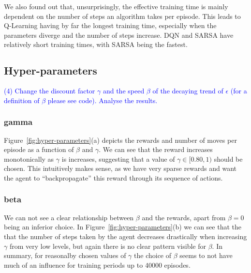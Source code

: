 \documentclass[conference]{IEEEtran}
\begin{document}
We also found out that, unsurprisingly, the effective training time is mainly dependent on the number of steps an algorithm takes per episode. This leads to Q-Learning having by far the longest training time, especially when the parameters diverge and the number of steps increase. DQN and SARSA have relatively short training times, with SARSA being the fastest.


\subsection{Hyper-parameters}\label{sec:hyper-parameters}



\textcolor{blue}{(4) Change the discount factor $\gamma$ and the speed $\beta$ of the decaying trend of $\epsilon$ (for a definition of $\beta$ please see code). Analyse the results.}


\subsubsection{gamma}
Figure~\ref{fig:hyper-parameters}(a) depicts the rewards and number of moves per episode as a function of $\beta$ and $\gamma$. We can see that the reward increases monotonically as $\gamma$ is increases, suggesting that a value of $\gamma\in[0.80, 1)$ should be chosen. This intuitively makes sense, as we have very sparse rewards and want the agent to ``backpropagate'' this reward through its sequence of actions. 

\subsubsection{beta}
We can not see a clear relationship between $\beta$ and the rewards, apart from $\beta=0$ being an inferior choice. In Figure~\ref{fig:hyper-parameters}(b) we can see that the that the number of steps taken by the agent decreases drastically when increasing $\gamma$ from very low levels, but again there is no clear pattern visible for $\beta$. In summary, for reasonalby chosen values of $\gamma$ the choice of $\beta$ seems to not have much of an influence for training periods up to 40000 episodes.
\end{document}
